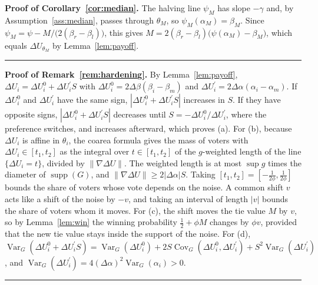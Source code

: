 \documentclass[12pt,letterpaper]{article}
\newenvironment{proof}[1][Proof]{\noindent\textbf{#1.} }{\ \rule{0.5em}{0.5em}}
\begin{document}
\begin{proof}[Proof of Corollary~\ref{cor:median}]
The halving line $\psi_M$ has slope $-\gamma$ and, by Assumption~\ref{ass:median}, passes through $\theta_M$, so $\psi_M(\alpha_M)=\beta_M$. Since $\psi_M=\psi-M/\big(2(\beta_r-\beta_l)\big)$, this gives $M=2(\beta_r-\beta_l)\big(\psi(\alpha_M)-\beta_M\big)$, which equals $\Delta U_{\theta_M}$ by Lemma~\ref{lem:payoff}.
\end{proof}

\begin{proof}[Proof of Remark~\ref{rem:hardening}]
By Lemma~\ref{lem:payoff}, $\Delta U_i=\Delta U_i^0+\Delta U_i^{\prime}S$ with $\Delta U_i^0=2\Delta\beta(\beta_i-\beta_m)$ and $\Delta U_i^{\prime}=2\Delta\alpha(\alpha_i-\alpha_m)$. If $\Delta U_i^0$ and $\Delta U_i^{\prime}$ have the same sign, $|\Delta U_i^0+\Delta U_i^{\prime}S|$ increases in $S$. If they have opposite signs, $|\Delta U_i^0+\Delta U_i^{\prime}S|$ decreases until $S=-\Delta U_i^0/\Delta U_i^{\prime}$, where the preference switches, and increases afterward, which proves (a). For (b), because $\Delta U_i$ is affine in $\theta_i$, the coarea formula \citep{EvansGariepy2015} gives the mass of voters with $\Delta U_i\in[t_1,t_2]$ as the integral over $t\in[t_1,t_2]$ of the $g$-weighted length of the line $\{\Delta U_i=t\}$, divided by $\|\nabla\Delta U\|$. The weighted length is at most $\sup g$ times the diameter of $\operatorname{supp}(G)$, and $\|\nabla\Delta U\|\ge2|\Delta\alpha|S$. Taking $[t_1,t_2]=[-\tfrac{1}{2\phi},\tfrac{1}{2\phi}]$ bounds the share of voters whose vote depends on the noise. A common shift $v$ acts like a shift of the noise by $-v$, and taking an interval of length $|v|$ bounds the share of voters whom it moves. For (c), the shift moves the tie value $M$ by $v$, so by Lemma~\ref{lem:win} the winning probability $\tfrac12+\phi M$ changes by $\phi v$, provided that the new tie value stays inside the support of the noise. For (d), $\operatorname{Var}_G(\Delta U_i^0+\Delta U_i^{\prime}S)=\operatorname{Var}_G(\Delta U_i^0)+2S\operatorname{Cov}_G(\Delta U_i^0,\Delta U_i^{\prime})+S^2\operatorname{Var}_G(\Delta U_i^{\prime})$, and $\operatorname{Var}_G(\Delta U_i^{\prime})=4(\Delta\alpha)^2\operatorname{Var}_G(\alpha_i)>0$.
\end{proof}
\end{document}
